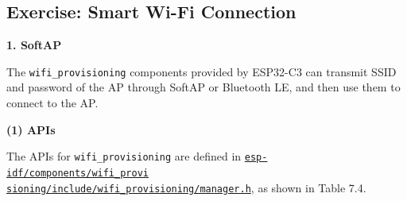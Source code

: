 \documentclass[a4paper,12pt,openany]{book}
\begin{document}
\subsection{Exercise: Smart Wi-Fi Connection}
\textbf{1. SoftAP}

The \verb|wifi_provisioning| components provided by ESP32-C3 can transmit SSID and password of the AP through SoftAP or Bluetooth LE, and then use them to connect to the AP.

\textbf{(1) APIs}

The APIs for \verb|wifi_provisioning| are defined in \href{https://github.com/espressif/esp-idf/blob/master/components/wifi_provisioning/include/wifi_provisioning/manager.h}{\texttt{esp-idf/components/wifi\_provi\\ sioning/include/wifi\_provisioning/manager.h}}, as shown in Table 7.4.
\end{document}
